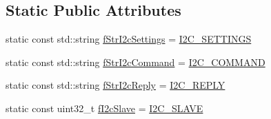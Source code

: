 \subsection*{Static Public Attributes}
\begin{DoxyCompactItemize}
\item 
static const std\-::string \hyperlink{class_ph2___hw_interface_1_1_cbc_interface_ab45dcb5563c94075ac0a3e17d17c1fd4}{f\-Str\-I2c\-Settings} = \hyperlink{_cbc_interface_8cc_a15db09e24617ea5c5843213672ac8a03}{I2\-C\-\_\-\-S\-E\-T\-T\-I\-N\-G\-S}
\item 
static const std\-::string \hyperlink{class_ph2___hw_interface_1_1_cbc_interface_a350e32baca2a50220eeff24b9fa07054}{f\-Str\-I2c\-Command} = \hyperlink{_cbc_interface_8cc_ae308275dafb538f2511ea285fea768d0}{I2\-C\-\_\-\-C\-O\-M\-M\-A\-N\-D}
\item 
static const std\-::string \hyperlink{class_ph2___hw_interface_1_1_cbc_interface_a6a0730099e121a7707615ba6969afe80}{f\-Str\-I2c\-Reply} = \hyperlink{_cbc_interface_8cc_a46aaa2293185dfc3cd655f65bea7f614}{I2\-C\-\_\-\-R\-E\-P\-L\-Y}
\item 
static const uint32\-\_\-t \hyperlink{class_ph2___hw_interface_1_1_cbc_interface_ad5257bb9fac0efe9cb8307a04f51ef77}{f\-I2c\-Slave} = \hyperlink{_cbc_interface_8cc_ab15137f7c592d05573de99f078516157}{I2\-C\-\_\-\-S\-L\-A\-V\-E}
\end{DoxyCompactItemize}

